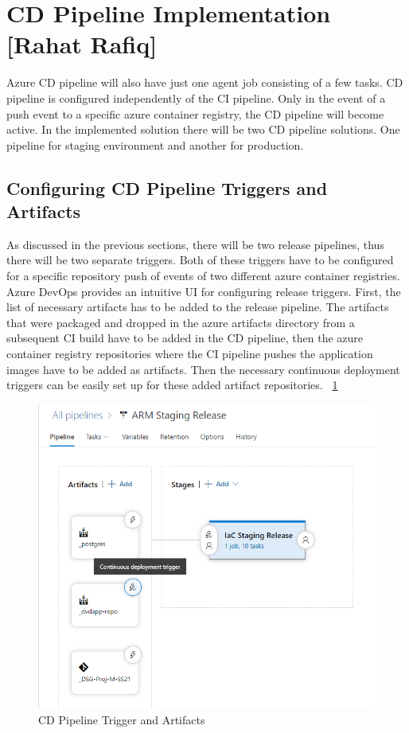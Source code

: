 \section{CD Pipeline Implementation [Rahat Rafiq]}\label{sec:cd_pipeline_implementaiton}

Azure CD pipeline will also have just one agent job consisting of a few tasks. CD pipeline is configured independently of the CI pipeline. Only in the event of a push event to a specific azure container registry, the CD pipeline will become active. In the implemented solution there will be two CD pipeline solutions. One pipeline for staging environment and another for production. 

\subsection{Configuring CD Pipeline Triggers and Artifacts}
As discussed in the previous sections, there will be two release pipelines, thus there will be two separate triggers. Both of these triggers have to be configured for a specific repository push of events of two different azure container registries. Azure DevOps provides an intuitive UI for configuring release triggers. First, the list of necessary artifacts has to be added to the release pipeline. The artifacts that were packaged and dropped in the azure artifacts directory from a subsequent CI build have to be added in the CD pipeline, then the azure container registry repositories where the CI pipeline pushes the application images have to be added as artifacts. Then the necessary continuous deployment triggers can be easily set up for these added artifact repositories. ~\ref{fig:cd_pipeline_trigger_and_artifacts}

\begin{figure}
    \centering
    \includegraphics[width=14cm]{images/Rahat/cd-trigger.png}
    \caption{CD Pipeline Trigger and Artifacts}
    \label{fig:cd_pipeline_trigger_and_artifacts}
\end{figure}

